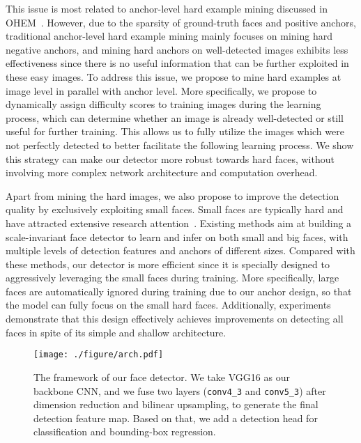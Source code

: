 \documentclass[10pt,twocolumn,letterpaper]{article}
\begin{document}
This issue is most related to anchor-level hard example mining discussed in OHEM~\cite{shrivastava2016training}. However, due to the sparsity of ground-truth faces and positive
anchors, traditional anchor-level hard example mining mainly focuses on mining
hard negative anchors, and
mining hard anchors on well-detected images exhibits less effectiveness since there is no useful information that can be further exploited in these easy images.
To address this issue, we propose to mine hard examples at image level in parallel with anchor level. More specifically, we propose to dynamically assign
difficulty scores to training images during the learning process, which can determine whether an image is already well-detected or still useful for further training.
This allows us to fully utilize the images which were not perfectly detected to better facilitate the following learning process. We show this strategy can make our detector more robust towards hard faces, without involving more complex network architecture and computation overhead.

Apart from mining the hard images, we also propose to improve the detection quality by exclusively exploiting small faces.
Small faces are typically hard and have attracted extensive research attention~\cite{BaiFindingTF,hu2017finding,zhu2018seeing}. Existing methods aim at building a scale-invariant face detector to learn
and infer on both small and big faces, with multiple levels of detection features and anchors of different sizes.
Compared with these methods, our detector is more efficient since it is specially designed to aggressively leveraging the small faces during training.
More specifically, large faces are automatically ignored during training  due to our anchor design, so that the model can fully focus on the small hard faces.
Additionally, experiments demonstrate that this design effectively achieves improvements on detecting all faces in spite of its simple and shallow architecture.


\begin{figure*}[!ht]
\texttt{[image: ./figure/arch.pdf]}
\caption{The framework of our face detector. We take VGG16 as our backbone
CNN, and we fuse two layers (\texttt{conv4\_3} and \texttt{conv5\_3}) after dimension reduction
and bilinear upsampling, to generate the final detection feature map. Based on that,
we add a detection head for classification and bounding-box regression.}
\label{fig:arch}
\end{figure*}
\end{document}

